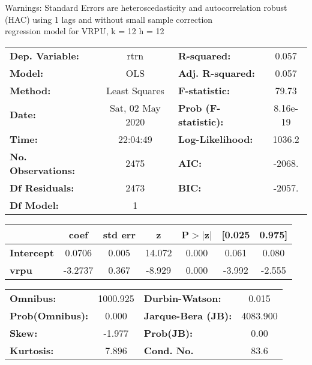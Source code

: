 Warnings: \newline
 [1] Standard Errors are heteroscedasticity and autocorrelation robust (HAC) using 1 lags and without small sample correction\\ 

regression model for VRPU, k = 12 h = 12\begin{center}
\begin{tabular}{lclc}
\toprule
\textbf{Dep. Variable:}    &       rtrn       & \textbf{  R-squared:         } &     0.057   \\
\textbf{Model:}            &       OLS        & \textbf{  Adj. R-squared:    } &     0.057   \\
\textbf{Method:}           &  Least Squares   & \textbf{  F-statistic:       } &     79.73   \\
\textbf{Date:}             & Sat, 02 May 2020 & \textbf{  Prob (F-statistic):} &  8.16e-19   \\
\textbf{Time:}             &     22:04:49     & \textbf{  Log-Likelihood:    } &    1036.2   \\
\textbf{No. Observations:} &        2475      & \textbf{  AIC:               } &    -2068.   \\
\textbf{Df Residuals:}     &        2473      & \textbf{  BIC:               } &    -2057.   \\
\textbf{Df Model:}         &           1      & \textbf{                     } &             \\
\bottomrule
\end{tabular}
\begin{tabular}{lcccccc}
                   & \textbf{coef} & \textbf{std err} & \textbf{z} & \textbf{P$> |$z$|$} & \textbf{[0.025} & \textbf{0.975]}  \\
\midrule
\textbf{Intercept} &       0.0706  &        0.005     &    14.072  &         0.000        &        0.061    &        0.080     \\
\textbf{vrpu}      &      -3.2737  &        0.367     &    -8.929  &         0.000        &       -3.992    &       -2.555     \\
\bottomrule
\end{tabular}
\begin{tabular}{lclc}
\textbf{Omnibus:}       & 1000.925 & \textbf{  Durbin-Watson:     } &    0.015  \\
\textbf{Prob(Omnibus):} &   0.000  & \textbf{  Jarque-Bera (JB):  } & 4083.900  \\
\textbf{Skew:}          &  -1.977  & \textbf{  Prob(JB):          } &     0.00  \\
\textbf{Kurtosis:}      &   7.896  & \textbf{  Cond. No.          } &     83.6  \\
\bottomrule
\end{tabular}
\end{center}

